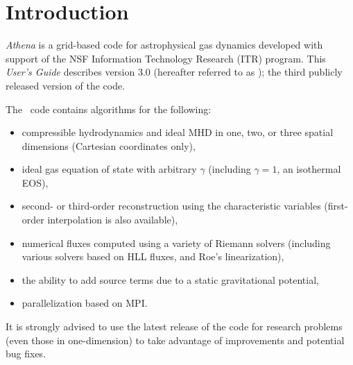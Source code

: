 \section{Introduction}

{\it Athena} is a grid-based code for astrophysical gas dynamics
developed with support of the NSF Information Technology Research (ITR)
program.  This {\it User's Guide} describes version 3.0 (hereafter
referred to as \ath); the third publicly released version of the code.

The \ath\ code contains algorithms for the following:
\begin{itemize}

\item compressible hydrodynamics and ideal MHD in one, two, or three spatial dimensions (Cartesian coordinates only),

\item ideal gas equation of state with arbitrary $\gamma$ (including 
$\gamma = 1$, an isothermal EOS),

\item second- or third-order reconstruction using the characteristic variables
(first-order interpolation is also available),

\item numerical fluxes computed using a variety of Riemann solvers (including
various solvers based on HLL fluxes, and Roe's linearization),

\item the ability to add source terms due to a static gravitational potential,

\item parallelization based on MPI.

\end{itemize}
It is strongly advised to use the latest release of
the code for research problems (even those in one-dimension) to take
advantage of improvements and potential bug fixes.

